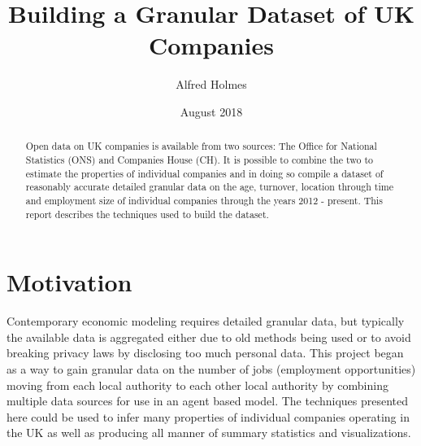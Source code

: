 \documentclass[a4paper,10pt]{article}
\title{Building a Granular Dataset of UK Companies}
\author{Alfred Holmes}
\date{August 2018}
\begin{document}
\maketitle

\begin{abstract}
    Open data on UK companies is available from two sources: The Office for National Statistics (ONS) and Companies House (CH). It is possible to combine the two to estimate the properties of individual companies and in doing so compile a dataset of reasonably accurate detailed granular data on the age, turnover, location through time and employment size of individual companies through the years 2012 - present. This report describes the techniques used to build the dataset.
\end{abstract}
\section*{Motivation}
Contemporary economic modeling requires detailed granular data, but typically the available data is aggregated either due to old methods being used or to avoid breaking privacy laws by disclosing too much personal data. This project began as a way to gain granular data on the number of jobs (employment opportunities) moving from each local authority to each other local authority by combining multiple data sources for use in an agent based model. The techniques presented here could be used to infer many properties of individual companies operating in the UK as well as producing all manner of summary statistics and visualizations.
\end{document}
